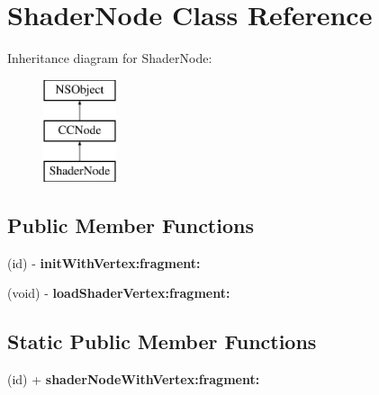 \hypertarget{interface_shader_node}{\section{Shader\-Node Class Reference}
\label{interface_shader_node}
}
Inheritance diagram for Shader\-Node\-:\begin{figure}[H]
\begin{center}
\leavevmode
\includegraphics[height=3.000000cm]{interface_shader_node}
\end{center}
\end{figure}
\subsection*{Public Member Functions}
\begin{DoxyCompactItemize}
\item 
\hypertarget{interface_shader_node_a336a1a0f517ebf444be792a378a09051}{(id) -\/ {\bfseries init\-With\-Vertex\-:fragment\-:}}\label{interface_shader_node_a336a1a0f517ebf444be792a378a09051}

\item 
\hypertarget{interface_shader_node_a377c00425082f976865feb4e0c2f4db6}{(void) -\/ {\bfseries load\-Shader\-Vertex\-:fragment\-:}}\label{interface_shader_node_a377c00425082f976865feb4e0c2f4db6}

\end{DoxyCompactItemize}
\subsection*{Static Public Member Functions}
\begin{DoxyCompactItemize}
\item 
\hypertarget{interface_shader_node_a5f3313f7d07ac1cc2a3a56df320aa3fe}{(id) + {\bfseries shader\-Node\-With\-Vertex\-:fragment\-:}}\label{interface_shader_node_a5f3313f7d07ac1cc2a3a56df320aa3fe}

\end{DoxyCompactItemize}
